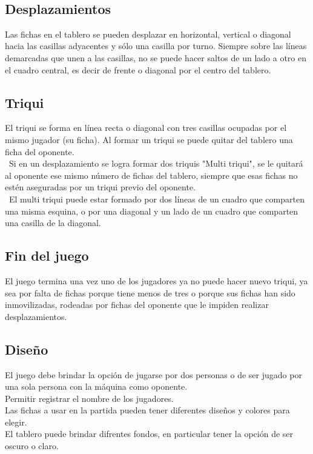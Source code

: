 ﻿﻿\documentclass{article}
\begin{document}
\subsection {Desplazamientos}

Las fichas en el tablero se pueden desplazar en horizontal, vertical o diagonal hacia las casillas adyacentes y sólo una casilla por turno. Siempre sobre las líneas demarcadas que unen a las casillas, no se puede hacer saltos de un lado a otro en el cuadro central, es decir de frente o diagonal por el centro del tablero.

\subsection {Triqui}

El triqui se forma en línea recta o diagonal con tres casillas ocupadas por el mismo jugador (su ficha). Al formar un triqui se puede quitar del tablero una ficha del oponente.\\\
Si en un desplazamiento se logra formar dos triquis "Multi triqui", se le quitará al oponente ese mismo número de fichas del tablero, siempre que esas fichas no estén aseguradas por un triqui previo del oponente.\\\
El multi triqui puede estar formado por dos líneas de un cuadro que comparten una misma esquina, o por una diagonal y un lado de un cuadro que comparten una casilla de la diagonal.

\subsection {Fin del juego}

El juego termina una vez uno de los jugadores ya no puede hacer nuevo triqui, ya sea por falta de fichas porque tiene menos de tres o porque sus fichas han sido inmovilizadas, rodeadas por fichas del oponente que le impiden realizar desplazamientos.

\subsection {Diseño}

El juego debe brindar la opción de jugarse por dos personas o de ser jugado por una sola persona con la máquina como oponente.\\
Permitir registrar el nombre de los jugadores.\\
Las fichas a usar en la partida pueden tener diferentes diseños y colores para elegir.\\
El tablero puede brindar difrentes fondos, en particular tener la opción de ser oscuro o claro.\\
\end{document}
